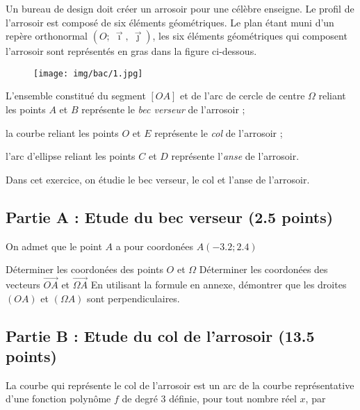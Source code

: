 \documentclass[answers]{exam}
\begin{document}
Un bureau de design doit créer un arrosoir pour une célèbre enseigne. Le profil de l'arrosoir est composé de six éléments géométriques. Le plan étant muni d'un repère orthonormal
$\left(O\mathpunct{} ; \ \overrightarrow{\imath}\mathpunct{},\ \overrightarrow{\jmath}\right)\mathpunct{}$, les six éléments géométriques qui composent l'arrosoir sont représentés en gras
dans la figure ci-dessous.

\begin{figure}[H]
  \centering
  \texttt{[image: img/bac/1.jpg]}
\end{figure}

\begin{compactitem}
  \item L'ensemble constitué du segment \([OA]\) et de l'arc de cercle de
        centre \(\Omega\) reliant les points \(A\) et \(B\) représente
        le \emph{bec verseur} de l'arrosoir ;
  \item la courbe reliant les points \(O\) et \(E\) représente le
        \emph{col} de l'arrosoir ;
  \item l'arc d'ellipse reliant les points \(C\) et \(D\) représente
        l'\emph{anse} de l'arrosoir.
\end{compactitem}

Dans cet exercice, on étudie le bec verseur, le col et l'anse de l'arrosoir.

\subsection*{Partie A : Etude du bec verseur (2.5 points)}

On admet que le point $A$ a pour coordonées $A(-3.2 ; 2.4)$

\begin{questions}
  \question[0.5] Déterminer les coordonées des points $O$ et $\Omega$ 
  \question[1] Déterminer les coordonées des vecteurs $\overrightarrow{OA}$ et $\overrightarrow{\Omega A}$
  \question[1] En utilisant la formule en annexe, démontrer que les droites $(OA)$ et $(\Omega A)$ sont perpendiculaires.
\end{questions}

\subsection*{Partie B : Etude du col de l'arrosoir (13.5 points)}

La courbe qui représente le col de l'arrosoir est un arc de la courbe
représentative d'une fonction polynôme $f$ de degré 3 définie, pour tout
nombre réel $x$, par
\end{document}
